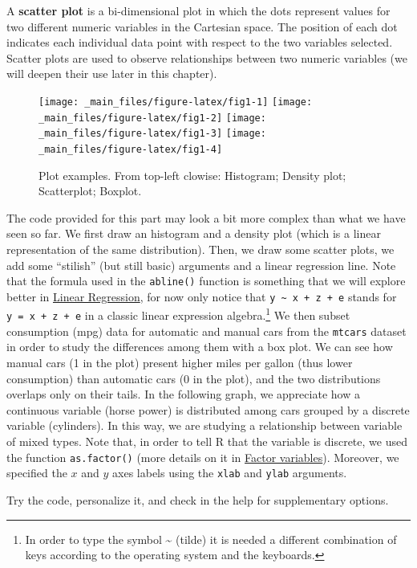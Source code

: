 \documentclass[
]{svmono}
\begin{document}
A \textbf{scatter plot} is a bi-dimensional plot in which the dots represent
values for two different numeric variables in the Cartesian space. The
position of each dot indicates each individual data point with respect
to the two variables selected. Scatter plots are used to observe
relationships between two numeric variables (we will deepen their use
later in this chapter).

\begin{figure}[H]
\texttt{[image: \_main\_files/figure-latex/fig1-1]} \texttt{[image: \_main\_files/figure-latex/fig1-2]} \texttt{[image: \_main\_files/figure-latex/fig1-3]} \texttt{[image: \_main\_files/figure-latex/fig1-4]} \caption{Plot examples. From top-left clowise: Histogram; Density plot; Scatterplot; Boxplot.}\label{fig:fig1}
\end{figure}

The code provided for this part may look a bit more complex than what we
have seen so far. We first draw an histogram and a density plot (which
is a linear representation of the same distribution). Then, we draw some
scatter plots, we add some ``stilish'' (but still basic) arguments and a
linear regression line. Note that the formula used in the \texttt{abline()}
function is something that we will explore better in \protect\hyperlink{linear-regression}{Linear
Regression}, for now only notice that \texttt{y\ \textasciitilde{}\ x\ +\ z\ +\ e} stands for
\texttt{y\ =\ x\ +\ z\ +\ e} in a classic linear expression algebra.\footnote{In order to type the symbol \textasciitilde{} (tilde) it is needed a different
  combination of keys according to the operating system and the
  keyboards.} We then
subset consumption (mpg) data for automatic and manual cars from the
\texttt{mtcars} dataset in order to study the differences among them with a box
plot. We can see how manual cars (1 in the plot) present higher miles
per gallon (thus lower consumption) than automatic cars (0 in the plot),
and the two distributions overlaps only on their tails. In the following
graph, we appreciate how a continuous variable (horse power) is
distributed among cars grouped by a discrete variable (cylinders). In
this way, we are studying a relationship between variable of mixed
types. Note that, in order to tell R that the variable is discrete, we
used the function \texttt{as.factor()} (more details on it in \protect\hyperlink{factor-variables}{Factor
variables}). Moreover, we specified the \(x\) and \(y\) axes labels using
the \texttt{xlab} and \texttt{ylab} arguments.

Try the code, personalize it, and check in the help for supplementary
options.
\end{document}
